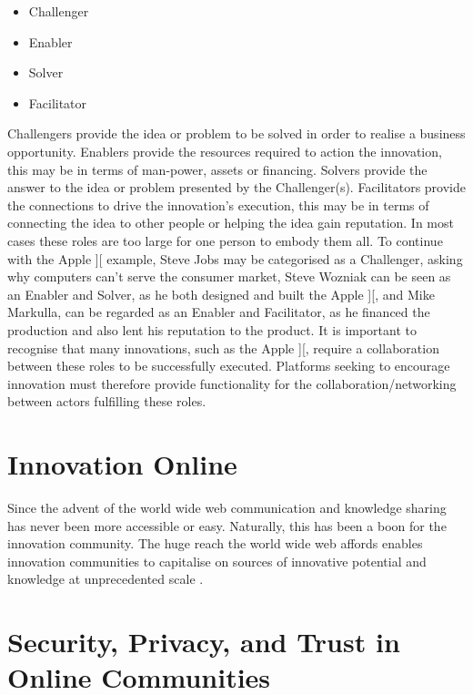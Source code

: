 \begin{itemize}
	\item Challenger
	\item Enabler
	\item Solver
	\item Facilitator
\end{itemize}

Challengers provide the idea or problem to be solved in order to realise a business opportunity. Enablers provide the resources required to action the innovation, this may be in terms of man-power, assets or financing. Solvers provide the answer to the idea or problem presented by the Challenger(s). Facilitators provide the connections to drive the innovation's execution, this may be in terms of connecting the idea to other people or helping the idea gain reputation. In most cases these roles are too large for one person to embody them all. To continue with the Apple ][ example, Steve Jobs may be categorised as a Challenger, asking why computers can't serve the consumer market, Steve Wozniak can be seen as an Enabler and Solver, as he both designed and built the Apple ][, and Mike Markulla, can be regarded as an Enabler and Facilitator, as he financed the production and also lent his reputation to the product. It is important to recognise that many innovations, such as the Apple ][, require a collaboration between these roles to be successfully executed. Platforms seeking to encourage innovation must therefore provide functionality for the collaboration/networking between actors fulfilling these roles.

\section{Innovation Online}
Since the advent of the world wide web communication and knowledge sharing has never been more accessible or easy. Naturally, this has been a boon for the innovation community. The huge reach the world wide web affords enables innovation communities to capitalise on sources of innovative potential and knowledge at unprecedented scale \cite{hautz2010establish}.

\section{Security, Privacy, and Trust in Online Communities}

